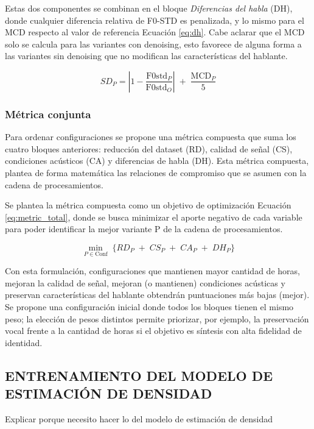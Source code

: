 Estas dos componentes se combinan en el bloque \emph{Diferencias del habla} (DH), donde cualquier diferencia relativa de F0-STD es penalizada, y lo mismo para el MCD respecto al valor de referencia Ecuación \ref{eq:dh}. Cabe aclarar que el MCD solo se calcula para las variantes con denoising, esto favorece de alguna forma a las variantes sin denoising que no modifican las características del hablante.

\begin{equation}
\label{eq:dh}
SD_P = 
\left|1 - \frac{\mathrm{F0std}_P}{\mathrm{F0std}_O}\right|
\;+\; \frac{\mathrm{MCD}_P}{5}
\end{equation}

\subsubsection{Métrica conjunta}
Para ordenar configuraciones se propone una métrica compuesta que suma los cuatro bloques anteriores: reducción del dataset (RD), calidad de señal (CS), condiciones acústicos (CA) y diferencias de habla (DH). Esta métrica compuesta, plantea de forma matemática las relaciones de compromiso que se asumen con la cadena de procesamientos. 

Se plantea la métrica compuesta como un objetivo de optimización Ecuación \ref{eq:metric_total}, donde se busca minimizar el aporte negativo de cada variable para poder identificar la mejor variante P de la cadena de procesamientos.

\begin{equation}
\label{eq:metric_total}
\min_{P \in \mathrm{Conf}}\;
\Big\{
RD_{P}
\;+\;
CS_{P}
\;+\;
CA_{P}
\;+\;
DH_{P}
\Big\}
\end{equation}

Con esta formulación, configuraciones que mantienen mayor cantidad de horas, mejoran la calidad de señal, mejoran (o mantienen) condiciones acústicas y preservan características del hablante obtendrán puntuaciones más bajas (mejor). Se propone una configuración inicial donde todos los bloques tienen el mismo peso; la elección de pesos distintos permite priorizar, por ejemplo, la preservación vocal frente a la cantidad de horas si el objetivo es síntesis con alta fidelidad de identidad.

\subsection{ENTRENAMIENTO DEL MODELO DE ESTIMACIÓN DE DENSIDAD}
Explicar porque necesito hacer lo del modelo de estimación de densidad

